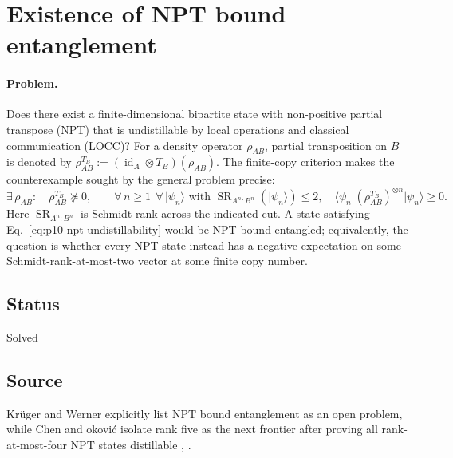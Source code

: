 \section{Existence of NPT bound entanglement}
\label{sec:op_74c4ffb5b042baf2}

\paragraph{Problem.}
Does there exist a finite-dimensional bipartite state with non-positive
partial transpose (NPT) that is undistillable by local operations and
classical communication (LOCC)?  For a density operator $\rho_{AB}$, partial
transposition on $B$ is denoted by
$\rho_{AB}^{T_B}:=(\operatorname{id}_A\otimes T_B)(\rho_{AB})$.  The
finite-copy criterion makes the counterexample sought by the general problem
precise:
\begin{equation}
  \exists\,\rho_{AB}:\quad
  \rho_{AB}^{T_B}\not\succeq0,
  \qquad
  \forall\,n\geq1\ \ \forall\,\lvert\psi_n\rangle
  \text{ with }\operatorname{SR}_{A^n:B^n}(\lvert\psi_n\rangle)\leq2,
  \quad
  \langle\psi_n\rvert
    (\rho_{AB}^{T_B})^{\otimes n}
  \lvert\psi_n\rangle\geq0.
  \label{eq:p10-npt-undistillability}
\end{equation}
Here $\operatorname{SR}_{A^n:B^n}$ is Schmidt rank across the indicated cut.
A state satisfying Eq.~\eqref{eq:p10-npt-undistillability} would be NPT bound
entangled; equivalently, the question is whether every NPT state instead has
a negative expectation on some Schmidt-rank-at-most-two vector at some finite
copy number.

\subsection*{Status}

Solved

\subsection*{Source}

Kr\"uger and Werner explicitly list NPT bound entanglement as an open
problem, while Chen and \DJ okovi\'c isolate rank five as the next
frontier after proving all rank-at-most-four NPT states distillable
,
.

